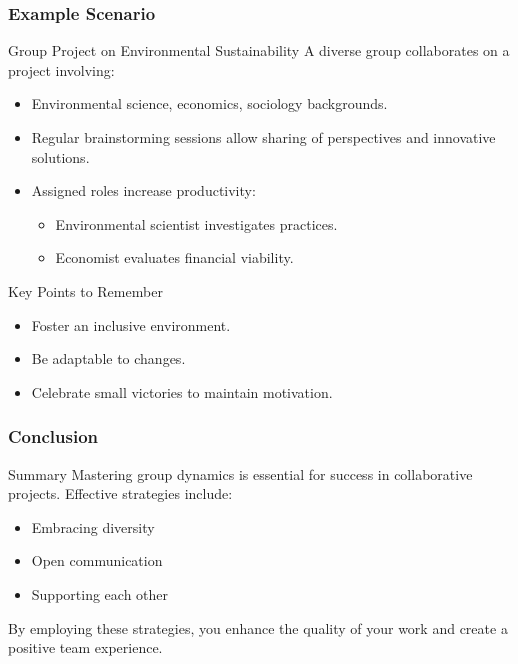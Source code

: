 \documentclass[aspectratio=169]{beamer}
\begin{document}
\begin{frame}[fragile]
    \frametitle{Example Scenario}
    \begin{block}{Group Project on Environmental Sustainability}
        A diverse group collaborates on a project involving:
        \begin{itemize}
            \item Environmental science, economics, sociology backgrounds.
            \item Regular brainstorming sessions allow sharing of perspectives and innovative solutions.
            \item Assigned roles increase productivity:
                \begin{itemize}
                    \item Environmental scientist investigates practices.
                    \item Economist evaluates financial viability.
                \end{itemize}
        \end{itemize}
    \end{block}

    \begin{block}{Key Points to Remember}
        \begin{itemize}
            \item Foster an inclusive environment.
            \item Be adaptable to changes.
            \item Celebrate small victories to maintain motivation.
        \end{itemize}
    \end{block}
\end{frame}

\begin{frame}[fragile]
    \frametitle{Conclusion}
    \begin{block}{Summary}
        Mastering group dynamics is essential for success in collaborative projects. 
        Effective strategies include:
        \begin{itemize}
            \item Embracing diversity
            \item Open communication
            \item Supporting each other 
        \end{itemize}
        By employing these strategies, you enhance the quality of your work and create a positive team experience. 
    \end{block}
\end{frame}
\end{document}
